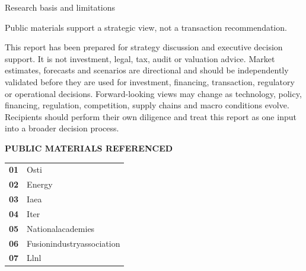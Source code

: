 \documentclass[10pt,a4paper]{article}
\begin{document}
\clearpage
\noindent{}\par\vspace{8pt}
{\sffamily\fontsize{22}{27}\selectfont\color{BONavy} Research basis and limitations}\par\vspace{9pt}
\begin{minipage}[t]{0.47\linewidth}
{\sffamily\fontsize{15}{20}\selectfont\color{BOGreen} Public materials support a strategic view, not a transaction recommendation.}\par\vspace{7pt}
{\footnotesize\color{BOText} This report has been prepared for strategy discussion and executive decision support. It is not investment, legal, tax, audit or valuation advice. Market estimates, forecasts and scenarios are directional and should be independently validated before they are used for investment, financing, transaction, regulatory or operational decisions. Forward-looking views may change as technology, policy, financing, regulation, competition, supply chains and macro conditions evolve. Recipients should perform their own diligence and treat this report as one input into a broader decision process.}\par
\end{minipage}\hfill\begin{minipage}[t]{0.46\linewidth}
{\textcolor{BOGreen}{\scriptsize\bfseries PUBLIC MATERIALS REFERENCED}}\par\vspace{5pt}
\begin{tabularx}{\linewidth}{p{8mm}Y}
\textcolor{BOGreen}{\bfseries 01} & {\scriptsize Osti} \\[4pt]
\textcolor{BOGreen}{\bfseries 02} & {\scriptsize Energy} \\[4pt]
\textcolor{BOGreen}{\bfseries 03} & {\scriptsize Iaea} \\[4pt]
\textcolor{BOGreen}{\bfseries 04} & {\scriptsize Iter} \\[4pt]
\textcolor{BOGreen}{\bfseries 05} & {\scriptsize Nationalacademies} \\[4pt]
\textcolor{BOGreen}{\bfseries 06} & {\scriptsize Fusionindustryassociation} \\[4pt]
\textcolor{BOGreen}{\bfseries 07} & {\scriptsize Llnl} \\[4pt]
\end{tabularx}
\end{minipage}\par\vspace{12pt}
\end{document}
